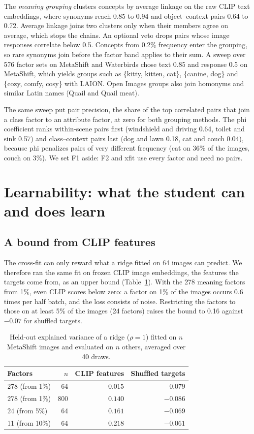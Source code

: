 \documentclass{article}
\begin{document}
The \emph{meaning grouping} clusters concepts by average linkage \citep{sokal1958upgma} on the raw CLIP
text embeddings, where synonyms reach 0.85 to 0.94 and object--context pairs 0.64 to 0.72. Average
linkage joins two clusters only when their members agree on average, which stops the chains. An
optional veto drops pairs whose image responses correlate below 0.5. Concepts from 0.2\% frequency
enter the grouping, so rare synonyms join before the factor band applies to their sum. A sweep over
576 factor sets on MetaShift and Waterbirds chose text 0.85 and response 0.5 on MetaShift, which yields
groups such as \{kitty, kitten, cat\}, \{canine, dog\} and \{cozy, comfy, cosy\} with LAION. Open
Images groups also join homonyms and similar Latin names (Quail and Quail meat).

The same sweep put pair precision, the share of the top correlated pairs that join a class factor to an
attribute factor, at zero for both grouping methods. The phi coefficient ranks within-scene pairs first
(windshield and driving 0.64, toilet and sink 0.57) and class--context pairs last (dog and lawn 0.18,
cat and couch 0.04), because phi penalizes pairs of very different frequency (cat on 36\% of the images,
couch on 3\%). We set F1 aside: F2 and xfit use every factor and need no pairs.

\section{Learnability: what the student can and does learn}
\label{sec:learnability}

\subsection{A bound from CLIP features}
The cross-fit can only reward what a ridge fitted on 64 images can predict. We therefore ran the same
fit on frozen CLIP image embeddings, the features the targets come from, as an upper bound
(Table~\ref{tab:bound}). With the 278 meaning factors from 1\%, even CLIP scores below zero: a factor on
1\% of the images occurs 0.6 times per half batch, and the loss consists of noise. Restricting the
factors to those on at least 5\% of the images (24 factors) raises the bound to 0.16 against $-0.07$
for shuffled targets.

\begin{table}[h]
\centering
\caption{Held-out explained variance of a ridge ($\rho=1$) fitted on $n$ MetaShift images and evaluated
on $n$ others, averaged over 40 draws.}
\label{tab:bound}
\small
\begin{tabular}{l r r r}
\toprule
Factors & $n$ & CLIP features & Shuffled targets \\
\midrule
278 (from 1\%) & 64 & $-0.015$ & $-0.079$ \\
278 (from 1\%) & 800 & $0.140$ & $-0.086$ \\
24 (from 5\%) & 64 & $0.161$ & $-0.069$ \\
11 (from 10\%) & 64 & $0.218$ & $-0.061$ \\
\bottomrule
\end{tabular}
\end{table}
\end{document}
